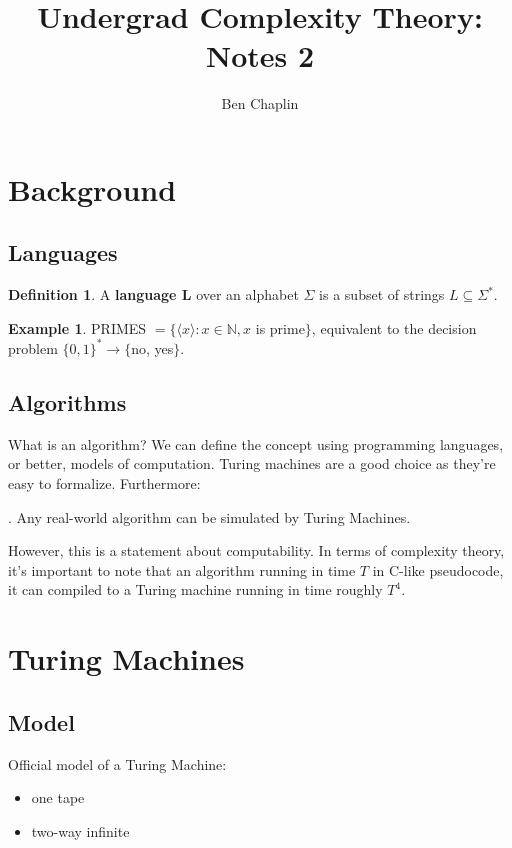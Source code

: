 \documentclass[11pt]{article}
\title{Undergrad Complexity Theory: Notes 2}
\author{Ben Chaplin}
\date{}
\theoremstyle{plain}
\theoremstyle{definition}
\newtheorem*{defn}{Definition}
\newtheorem*{ex}{Example}
\newcommand{\N}{\mathbb{N}}
\begin{document}
\maketitle
\tableofcontents

\section{Background}
\subsection{Languages}

\begin{defn}
    A {\bf language L} over an alphabet $\Sigma$ is a subset of strings $L \subseteq \Sigma^*$.
\end{defn}

\begin{ex}
PRIMES $= \{\langle x \rangle : x \in \N, x$ is prime$\}$, equivalent to the decision problem $\{0, 1\}^* \rightarrow \{$no, yes$\}$.
\end{ex}

\subsection{Algorithms}

What is an algorithm? We can define the concept using programming languages, or better, models of computation. Turing machines are 
a good choice as they're easy to formalize. Furthermore: \medskip

. Any real-world algorithm can be simulated by Turing Machines.\medskip

However, this is a statement about computability. In terms of complexity theory, it's important to note that an algorithm running in 
time $T$ in C-like pseudocode, it can compiled to a Turing machine running in time roughly $T^4$. 

\section{Turing Machines}
\subsection{Model}

Official model of a Turing Machine: 
\begin{itemize}
    \item one tape
    \item two-way infinite
\end{itemize}
\end{document}
